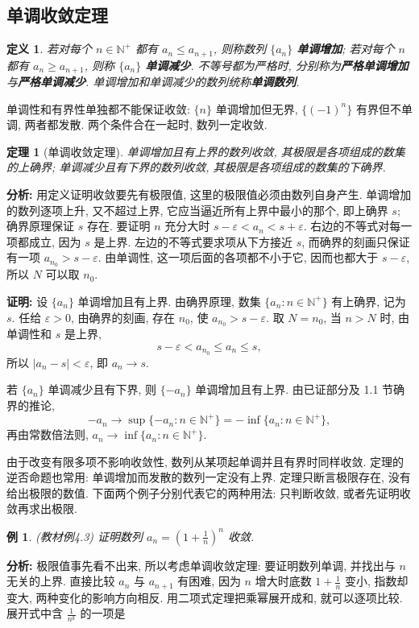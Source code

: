 \documentclass[UTF8,openany]{ctexbook}
\theoremstyle{chinesetextbook}
\newtheorem{definition}{定义}[section]
\newtheorem{example}{例}[section]
\newtheorem{theorem}{定理}[section]
\newenvironment{cnproof}{\par\indent\textbf{证明:} \ignorespaces}{\par}
\begin{document}
\subsection{单调收敛定理}
\begin{definition}
若对每个 $n\in\mathbb N^+$ 都有 $a_n\le a_{n+1}$, 则称数列 $\{a_n\}$ \textbf{单调增加}; 若对每个 $n$ 都有 $a_n\ge a_{n+1}$, 则称 $\{a_n\}$ \textbf{单调减少}. 不等号都为严格时, 分别称为\textbf{严格单调增加}与\textbf{严格单调减少}. 单调增加和单调减少的数列统称\textbf{单调数列}.
\end{definition}
单调性和有界性单独都不能保证收敛: $\{n\}$ 单调增加但无界, $\{(-1)^n\}$ 有界但不单调, 两者都发散. 两个条件合在一起时, 数列一定收敛.
\begin{theorem}[单调收敛定理]
单调增加且有上界的数列收敛, 其极限是各项组成的数集的上确界; 单调减少且有下界的数列收敛, 其极限是各项组成的数集的下确界.
\end{theorem}
\par\indent\textbf{分析:} 用定义证明收敛要先有极限值, 这里的极限值必须由数列自身产生. 单调增加的数列逐项上升, 又不超过上界, 它应当逼近所有上界中最小的那个, 即上确界 $s$; 确界原理保证 $s$ 存在. 要证明 $n$ 充分大时 $s-\varepsilon<a_n<s+\varepsilon$. 右边的不等式对每一项都成立, 因为 $s$ 是上界. 左边的不等式要求项从下方接近 $s$, 而确界的刻画只保证有一项 $a_{n_0}>s-\varepsilon$. 由单调性, 这一项后面的各项都不小于它, 因而也都大于 $s-\varepsilon$, 所以 $N$ 可以取 $n_0$.
\begin{cnproof}
设 $\{a_n\}$ 单调增加且有上界. 由确界原理, 数集 $\{a_n:n\in\mathbb N^+\}$ 有上确界, 记为 $s$. 任给 $\varepsilon>0$, 由确界的刻画, 存在 $n_0$, 使 $a_{n_0}>s-\varepsilon$. 取 $N=n_0$, 当 $n>N$ 时, 由单调性和 $s$ 是上界,
\[
s-\varepsilon<a_{n_0}\le a_n\le s,
\]
所以 $|a_n-s|<\varepsilon$, 即 $a_n\to s$.

若 $\{a_n\}$ 单调减少且有下界, 则 $\{-a_n\}$ 单调增加且有上界. 由已证部分及 1.1 节确界的推论,
\[
-a_n\to\sup\{-a_n:n\in\mathbb N^+\}=-\inf\{a_n:n\in\mathbb N^+\},
\]
再由常数倍法则, $a_n\to\inf\{a_n:n\in\mathbb N^+\}$.
\end{cnproof}
由于改变有限多项不影响收敛性, 数列从某项起单调并且有界时同样收敛. 定理的逆否命题也常用: 单调增加而发散的数列一定没有上界. 定理只断言极限存在, 没有给出极限的数值. 下面两个例子分别代表它的两种用法: 只判断收敛, 或者先证明收敛再求出极限.
\begin{example}
\textnormal{(教材例4.3)} 证明数列 $\displaystyle a_n=\left(1+\frac1n\right)^n$ 收敛.
\end{example}
\par\indent\textbf{分析:} 极限值事先看不出来, 所以考虑单调收敛定理: 要证明数列单调, 并找出与 $n$ 无关的上界. 直接比较 $a_n$ 与 $a_{n+1}$ 有困难, 因为 $n$ 增大时底数 $\displaystyle1+\frac1n$ 变小, 指数却变大, 两种变化的影响方向相反. 用二项式定理把乘幂展开成和, 就可以逐项比较. 展开式中含 $\displaystyle\frac1{n^k}$ 的一项是
\end{document}
